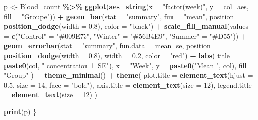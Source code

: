 \documentclass[
]{article}
\newenvironment{Shaded}{\begin{snugshade}}{\end{snugshade}}
\newcommand{\AttributeTok}[1]{\textcolor[rgb]{0.13,0.29,0.53}{#1}}
\newcommand{\DecValTok}[1]{\textcolor[rgb]{0.00,0.00,0.81}{#1}}
\newcommand{\FloatTok}[1]{\textcolor[rgb]{0.00,0.00,0.81}{#1}}
\newcommand{\FunctionTok}[1]{\textcolor[rgb]{0.13,0.29,0.53}{\textbf{#1}}}
\newcommand{\NormalTok}[1]{#1}
\newcommand{\OtherTok}[1]{\textcolor[rgb]{0.56,0.35,0.01}{#1}}
\newcommand{\SpecialCharTok}[1]{\textcolor[rgb]{0.81,0.36,0.00}{\textbf{#1}}}
\newcommand{\StringTok}[1]{\textcolor[rgb]{0.31,0.60,0.02}{#1}}
\begin{document}
\begin{Shaded}
\begin{Highlighting}[]
\NormalTok{  p }\OtherTok{\textless{}{-}}\NormalTok{ Blood\_count }\SpecialCharTok{\%\textgreater{}\%}
    \FunctionTok{ggplot}\NormalTok{(}\FunctionTok{aes\_string}\NormalTok{(}\AttributeTok{x =} \StringTok{"factor(week)"}\NormalTok{, }\AttributeTok{y =}\NormalTok{ col\_aes, }\AttributeTok{fill =} \StringTok{"Groupe"}\NormalTok{)) }\SpecialCharTok{+}
    \FunctionTok{geom\_bar}\NormalTok{(}\AttributeTok{stat =} \StringTok{"summary"}\NormalTok{, }\AttributeTok{fun =} \StringTok{"mean"}\NormalTok{, }\AttributeTok{position =} \FunctionTok{position\_dodge}\NormalTok{(}\AttributeTok{width =} \FloatTok{0.8}\NormalTok{), }\AttributeTok{color =} \StringTok{"black"}\NormalTok{) }\SpecialCharTok{+}
     \FunctionTok{scale\_fill\_manual}\NormalTok{(}\AttributeTok{values =} \FunctionTok{c}\NormalTok{(}\StringTok{"Control"} \OtherTok{=} \StringTok{"\#009E73"}\NormalTok{, }\StringTok{"Winter"} \OtherTok{=} \StringTok{"\#56B4E9"}\NormalTok{, }\StringTok{"Summer"} \OtherTok{=} \StringTok{"\#D55"}\NormalTok{)) }\SpecialCharTok{+}
    \FunctionTok{geom\_errorbar}\NormalTok{(}\AttributeTok{stat =} \StringTok{"summary"}\NormalTok{, }\AttributeTok{fun.data =}\NormalTok{ mean\_se, }
                  \AttributeTok{position =} \FunctionTok{position\_dodge}\NormalTok{(}\AttributeTok{width =} \FloatTok{0.8}\NormalTok{), }\AttributeTok{width =} \FloatTok{0.2}\NormalTok{, }\AttributeTok{color =} \StringTok{"red"}\NormalTok{) }\SpecialCharTok{+}
    \FunctionTok{labs}\NormalTok{(}
      \AttributeTok{title =} \FunctionTok{paste0}\NormalTok{(col, }\StringTok{" concentration ± SE"}\NormalTok{),}
      \AttributeTok{x =} \StringTok{"Week"}\NormalTok{,}
      \AttributeTok{y =} \FunctionTok{paste0}\NormalTok{(}\StringTok{"Mean "}\NormalTok{, col),}
      \AttributeTok{fill =} \StringTok{"Group"}
\NormalTok{    ) }\SpecialCharTok{+}
    \FunctionTok{theme\_minimal}\NormalTok{() }\SpecialCharTok{+}
    \FunctionTok{theme}\NormalTok{(}
      \AttributeTok{plot.title =} \FunctionTok{element\_text}\NormalTok{(}\AttributeTok{hjust =} \FloatTok{0.5}\NormalTok{, }\AttributeTok{size =} \DecValTok{14}\NormalTok{, }\AttributeTok{face =} \StringTok{"bold"}\NormalTok{),}
      \AttributeTok{axis.title =} \FunctionTok{element\_text}\NormalTok{(}\AttributeTok{size =} \DecValTok{12}\NormalTok{),}
      \AttributeTok{legend.title =} \FunctionTok{element\_text}\NormalTok{(}\AttributeTok{size =} \DecValTok{12}\NormalTok{)}
\NormalTok{    )}
  
  \FunctionTok{print}\NormalTok{(p)}
\NormalTok{\}}
\end{Highlighting}
\end{Shaded}
\end{document}
